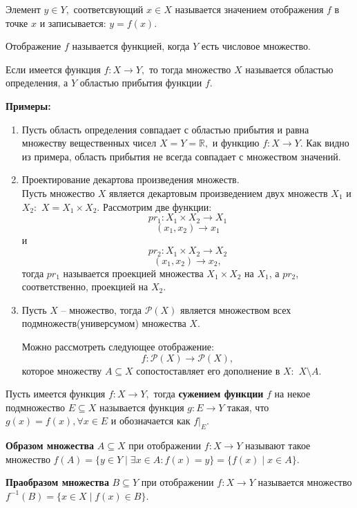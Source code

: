 Элемент $y\in Y,$ соответсвующий $x\in X$ называется значением отображения $f$ в точке $x$ и записывается: $y=f(x).$

Отображение $f$ называется функцией, когда $Y$ есть числовое множество.

Если имеется функция $f:X \rightarrow Y,$ то тогда множество $X$ называется областью определения, а $Y$ областью прибытия функции $f.$

\par\medskip \textbf{Примеры:}
\begin{enumerate}
\item Пусть область определения совпадает с областью прибытия и равна множеству вещественных чисел $X=Y=\mathbb{R},$ и функцию $f:X \rightarrow Y.$ Как видно из примера, область прибытия не всегда совпадает с множеством значений.
\item Проектирование декартова произведения множеств.
\\Пусть множество $X$ является декартовым произведением двух множеств $X_1$ и $X_2:$ $X=X_1 \times X_2.$ Рассмотрим две функции: $$pr_1:X_1\times X_2 \rightarrow X_1$$
$$(x_1,x_2) \rightarrow x_1$$
и $$pr_2:X_1\times X_2 \rightarrow X_2$$
$$(x_1,x_2) \rightarrow x_2,$$
тогда $pr_1$ называется проекцией множества $X_1\times X_2$ на $X_1$, а $pr_2$, соответственно, проекцией на $X_2.$
\item Пусть $X$ -- множество, тогда $\mathcal{P}(X)$ является множеством всех подмножеств(универсумом) множества $X.$

Можно рассмотреть следующее отображение: $$f:\mathcal{P}(X) \rightarrow \mathcal{P}(X),$$ которое множеству $A\subseteq X$ сопостоставляет его дополнение в $X:$ $X\setminus A.$
\end{enumerate}

\begin{Definition}
Пусть имеется функция $f:X \rightarrow Y,$ тогда {\bf сужением функции} $f$ на некое подмножество $E\subseteq X$ называется функция $g:E\rightarrow Y$ такая, что $g(x) = f(x), \forall x\in E$ и обозначается как $f|_{E}.$
\end{Definition}

\begin{Definition}
{\bf Образом множества} $A\subseteq X$ при отображении $f:X \rightarrow Y$ называют такое множество $f(A) = \{y\in Y\mid \exists x\in A: f(x)=y\} = \{f(x)\mid x\in A\}.$
\end{Definition}

\begin{Definition}
{\bf Праобразом множества} $B\subseteq Y$ при отображении $f:X\rightarrow Y$ называется множество $f^{-1}(B) = \{x\in X\mid f(x)\in B\}.$
\end{Definition}

